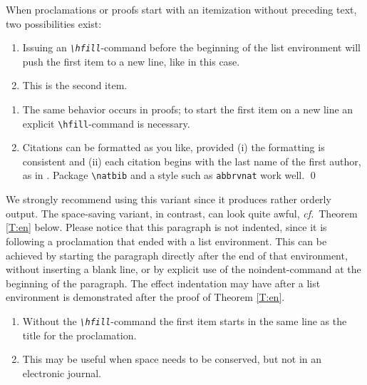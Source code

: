\documentclass{jpc} %
\theoremstyle{plain}\newtheorem{satz}[thm]{Satz} %
\def\cf{{\em cf.}}
\begin{document}
  When proclamations or proofs start with an itemization without
  preceding text, two possibilities exist:

\begin{thm}\label{T:m}\hfill  %
\begin{enumerate}
\item
  Issuing an {\em\texttt{\textbackslash hfill}}-command before the
  beginning of the list environment will push the first item to a new
  line, like in this case.
\item
  This is the second item.
\end{enumerate}
\end{thm}

\proof\hfill  %
\begin{enumerate}
\item
  The same behavior occurs in proofs; to start the first item on a
  new line an explicit \texttt{\textbackslash hfill}-command is necessary.
\item
  Citations can be formatted as you like, provided (i) the formatting is consistent and (ii) each citation begins with the last name of the first author, as in \cite{Abowd:Nissim:Skinner:2009}. Package \texttt{\textbackslash natbib} and a style such as \texttt{abbrvnat} work well. \qed
\end{enumerate}

  \noindent We strongly recommend using this variant since it produces
  rather orderly output.  The space-saving variant, in contrast, can
  look quite awful, \cf~Theorem \ref{T:en} below.  Please notice that
  this paragraph is not indented, since it is following a proclamation
  that ended with a list environment.  This can be achieved by
  starting the paragraph directly after the end of that environment,
  without inserting a blank line, or by explicit use of the
  noindent-command at the beginning of the paragraph.  The effect
  indentation may have after a list environment is demonstrated after
  the proof of Theorem \ref{T:en}.

\begin{thm}\label{T:en} %

\begin{enumerate}%
\item
  Without the \emph{\texttt{\textbackslash hfill}}-command the first item
  starts in the same line as the title for the proclamation.
\item
  This may be useful when space needs to be conserved, but not in an
  electronic journal.
\end{enumerate}
\end{thm}
\end{document}

